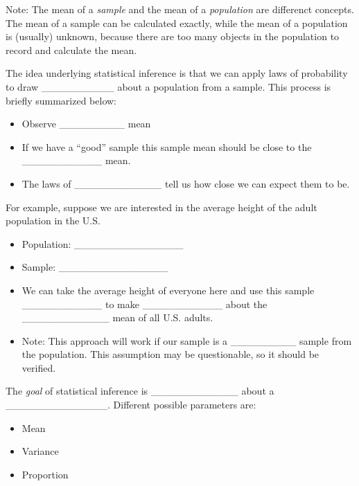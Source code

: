 \documentclass[]{book}
\providecommand{\tightlist}{%
  \setlength{\itemsep}{0pt}\setlength{\parskip}{0pt}}
\theoremstyle{definition}
\theoremstyle{definition}
\theoremstyle{remark}
\begin{document}
Note: The mean of a \emph{sample} and the mean of a \emph{population}
are differenct concepts. The mean of a sample can be calculated exactly,
while the mean of a population is (usually) unknown, because there are
too many objects in the population to record and calculate the mean.

The idea underlying statistical inference is that we can apply laws of
probability to draw \_\_\_\_\_\_\_\_\_\_ about a population from a
sample. This process is briefly summarized below:

\begin{itemize}
\tightlist
\item
  Observe \_\_\_\_\_\_\_\_\_ mean \vspace{.1in}
\item
  If we have a ``good'' sample this sample mean should be close to the
  \_\_\_\_\_\_\_\_\_\_\_ mean. \vspace{.1in}
\item
  The laws of \_\_\_\_\_\_\_\_\_\_\_\_ tell us how close we can expect
  them to be.
\end{itemize}

For example, suppose we are interested in the average height of the
adult population in the U.S.

\begin{itemize}
\tightlist
\item
  Population: \_\_\_\_\_\_\_\_\_\_\_\_\_\_\_ \vspace{.1in}
\item
  Sample: \_\_\_\_\_\_\_\_\_\_\_\_\_\_\_ \vspace{.1in}
\item
  We can take the average height of everyone here and use this sample
  \_\_\_\_\_\_\_\_\_\_\_ to make \_\_\_\_\_\_\_\_\_\_\_ about the
  \_\_\_\_\_\_\_\_\_\_\_\_ mean of all U.S. adults.
\item
  Note: This approach will work if our sample is a \_\_\_\_\_\_\_\_\_
  sample from the population. This assumption may be questionable, so it
  should be verified.
\end{itemize}

The \emph{goal} of statistical inference is \_\_\_\_\_\_\_\_\_\_\_\_
about a \_\_\_\_\_\_\_\_\_\_\_\_\_\_. Different possible parameters are:
\vspace{.1in}

\begin{itemize}
\tightlist
\item
  Mean
\item
  Variance
\item
  Proportion
\end{itemize}
\end{document}
